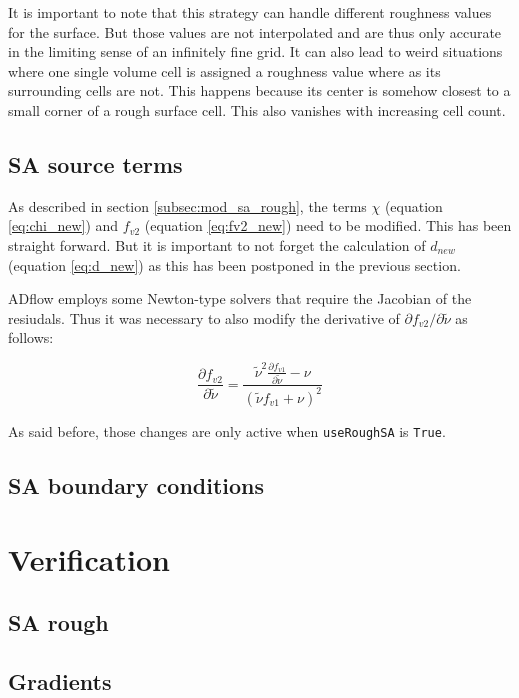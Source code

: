 \noindent It is important to note that this strategy can handle different
roughness values for the surface. But those values are not interpolated and are
thus only accurate in the limiting sense of an infinitely fine grid. It can also
lead to weird situations where one single volume cell is assigned a roughness
value where as its surrounding cells are not. This happens because its center is
somehow closest to a small corner of a rough surface cell. This also vanishes
with increasing cell count.

\subsection{SA source terms}
As described in section \ref{subsec:mod_sa_rough}, the terms $\chi$ (equation
\ref{eq:chi_new}) and $f_{v2}$ (equation \ref{eq:fv2_new}) need to be modified.
This has been straight forward. But it is important to not forget the
calculation of $d_{new}$ (equation \ref{eq:d_new}) as this has been postponed in
the previous section.

ADflow employs some Newton-type solvers that require the Jacobian of the
resiudals. Thus it was necessary to also modify the derivative of
$\partial f_{v2} / \partial \tilde \nu$ as follows:

\begin{equation}
  \frac{\partial f_{v2}}{\partial \tilde \nu} =
  \frac{\tilde \nu^{2} \frac{\partial f_{v1}}{\partial \tilde \nu} - \nu}
  {(\tilde \nu f_{v1} + \nu)^{2}}
\end{equation}

\noindent As said before, those changes are only active when \texttt{useRoughSA}
is \texttt{True}.

\subsection{SA boundary conditions}

\section{Verification}

\subsection{SA rough}

\subsection{Gradients}
